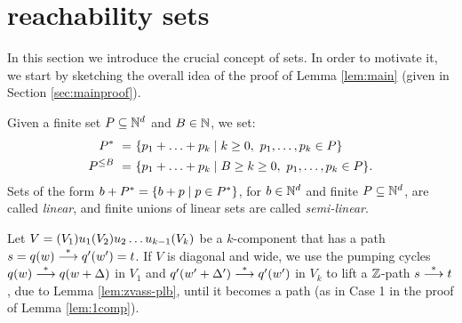 
\section{\Sandwich reachability sets} \label{sec:tools}
In this section we introduce the crucial concept of \emph{\sandwich} sets.
In order to motivate it, we start by sketching the overall idea of the
proof of Lemma \ref{lem:main} (given in Section \ref{sec:mainproof}). 

Given a finite set $P\subseteq \mathbb{N}^d$ and $B\in\mathbb{N}$, we set:
%
\begin{align*}
P^* \ =  \ & \{p_1 + \ldots + p_k \mid k\geq 0, \ p_1, \ldots, p_k \in P\} \\
P^{\leq B} \ =  \ & \{p_1 + \ldots + p_k \mid B\geq k\geq 0, \ p_1, \ldots, p_k \in P\}.
\end{align*}
%
Sets of the form $b + P^* = \{b+p \mid p\in P^*\}$, for $b\in\mathbb{N}^d$ and finite $P\subseteq\mathbb{N}^d$,
are called \emph{linear},
and finite unions of linear sets are called \emph{semi-linear}.



Let $V=(V_1) u_1 (V_2) u_2 \ldots u_{k-1} (V_k)$ be a $k$-component \tvass  that has a path $s=q(w) \stackrel{*}{\longrightarrow} q'(w')=t$.
%
If $V$ is diagonal and wide,
we use the pumping cycles $q(w) \stackrel{*}{\longrightarrow} q(w+\Delta)$ in $V_1$ and
$q'(w'+\Delta') \stackrel{*}{\longrightarrow} q'(w')$ in $V_k$ to lift a $\mathbb{Z}$-path $s\stackrel{*}{\longrightarrow} t$, \plb
due to Lemma \ref{lem:zvass-plb}, until it becomes a path
(as in Case 1 in the proof of Lemma \ref{lem:1comp}).

